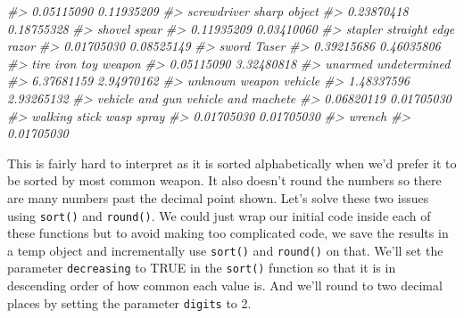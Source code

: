 \documentclass[
  12pt,
]{book}
\newenvironment{Shaded}{\begin{snugshade}}{\end{snugshade}}
\newcommand{\CommentTok}[1]{\textcolor[rgb]{0.37,0.37,0.37}{\textit{#1}}}
\begin{document}
\begin{Shaded}
\begin{Highlighting}[]
\CommentTok{\#\textgreater{}                       0.05115090                       0.11935209 }
\CommentTok{\#\textgreater{}                      screwdriver                     sharp object }
\CommentTok{\#\textgreater{}                       0.23870418                       0.18755328 }
\CommentTok{\#\textgreater{}                           shovel                            spear }
\CommentTok{\#\textgreater{}                       0.11935209                       0.03410060 }
\CommentTok{\#\textgreater{}                          stapler              straight edge razor }
\CommentTok{\#\textgreater{}                       0.01705030                       0.08525149 }
\CommentTok{\#\textgreater{}                            sword                            Taser }
\CommentTok{\#\textgreater{}                       0.39215686                       0.46035806 }
\CommentTok{\#\textgreater{}                        tire iron                       toy weapon }
\CommentTok{\#\textgreater{}                       0.05115090                       3.32480818 }
\CommentTok{\#\textgreater{}                          unarmed                     undetermined }
\CommentTok{\#\textgreater{}                       6.37681159                       2.94970162 }
\CommentTok{\#\textgreater{}                   unknown weapon                          vehicle }
\CommentTok{\#\textgreater{}                       1.48337596                       2.93265132 }
\CommentTok{\#\textgreater{}                  vehicle and gun              vehicle and machete }
\CommentTok{\#\textgreater{}                       0.06820119                       0.01705030 }
\CommentTok{\#\textgreater{}                    walking stick                       wasp spray }
\CommentTok{\#\textgreater{}                       0.01705030                       0.01705030 }
\CommentTok{\#\textgreater{}                           wrench }
\CommentTok{\#\textgreater{}                       0.01705030}
\end{Highlighting}
\end{Shaded}

This is fairly hard to interpret as it is sorted alphabetically when we'd prefer it to be sorted by most common weapon. It also doesn't round the numbers so there are many numbers past the decimal point shown. Let's solve these two issues using \texttt{sort()} and \texttt{round()}. We could just wrap our initial code inside each of these functions but to avoid making too complicated code, we save the results in a temp object and incrementally use \texttt{sort()} and \texttt{round()} on that. We'll set the parameter \texttt{decreasing} to TRUE in the \texttt{sort()} function so that it is in descending order of how common each value is. And we'll round to two decimal places by setting the parameter \texttt{digits} to 2.
\end{document}
